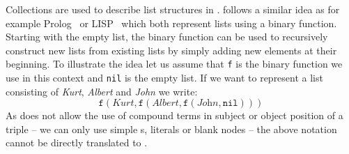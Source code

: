 % 
% 
Collections are used to describe list structures in \rdf.
\rdf follows a similar idea as for example Prolog~\cite{Prolog,nilsson} or LISP~\cite{lisp} which both represent lists using a binary 
function. %
Starting with the empty list, the binary function can be used to recursively construct new lists from existing lists by simply adding new elements at their beginning.
To illustrate the idea let us assume that \texttt{f} is the binary function we use in this context and \texttt{nil} is the empty list. If we want to represent a list consisting of 
\emph{Kurt}, \emph{Albert} and \emph{John} we write:
\begin{equation}\label{flist}
 \texttt{f}(\textit{Kurt}, \texttt{f}(\textit{Albert}, \texttt{f}(\textit{John}, \texttt{nil})))
\end{equation}
As \rdf does not allow the use of compound terms in subject or object position of a triple -- we can only use simple \iri{}s, literals or blank nodes -- the above notation cannot be directly
translated to \rdf. %

